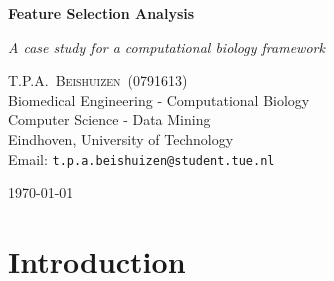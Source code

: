 \documentclass[10pt,a4paper]{article}
\newcommand{\documenttitle}{Feature Selection Analysis}
\newcommand{\documentsubtitle}{A case study for a computational biology framework}
\begin{document}
	
	\begin{titlepage}
		
		\center
		
		\vspace*{3cm}
		
		\textbf{\huge \documenttitle}
		
		\textit{\LARGE \documentsubtitle}
		
		\vspace*{2cm}
		
		\large
		\centering
		T.P.A.~\textsc{Beishuizen}~(0791613)\\
		Biomedical Engineering - Computational Biology\\
		Computer Science - Data Mining\\
		Eindhoven, University of Technology\\
		Email: \texttt{t.p.a.beishuizen@student.tue.nl}
		
		\vfill
		
		\vspace*{1cm}
		
		\today
		
	\end{titlepage}
	
	\tableofcontents
	
	
	\pagestyle{fancy}
	\fancyhead{} %
	\fancyfoot{} %
	\renewcommand{\headrulewidth}{0.4pt}
	\renewcommand{\footrulewidth}{0.4pt}
	
	\fancyhead[L]{\rightmark}
	\fancyfoot[C]{\thepage}
	
	
	\clearpage
	
	\section{Introduction}
	\label{sec:Introduction}
	
\end{document}
